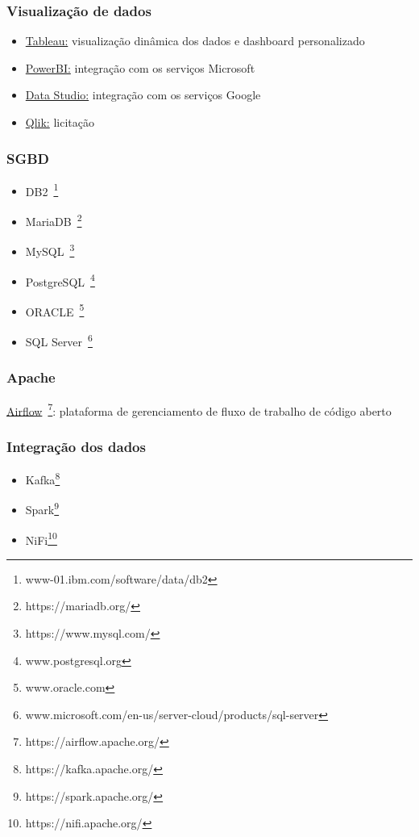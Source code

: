 \subsubsection*{Visualização de dados}
\begin{itemize} 
	\item \underline{Tableau:} visualização dinâmica dos dados e dashboard personalizado
	\item \underline{PowerBI:} integração com os serviços Microsoft
	\item \underline{Data Studio:} integração com os serviços Google
	\item \underline{Qlik:} licitação 
\end{itemize}


\subsubsection*{SGBD}
\begin{itemize}
	\item DB2~\footnote{www-01.ibm.com/software/data/db2}
	\item MariaDB~\footnote{https://mariadb.org/}
	\item MySQL~\footnote{https://www.mysql.com/}
	\item PostgreSQL~\footnote{www.postgresql.org}
	\item ORACLE~\footnote{www.oracle.com}
	\item SQL Server~\footnote{www.microsoft.com/en-us/server-cloud/products/sql-server}
\end{itemize}
	

\subsubsection*{Apache}
\underline{Airflow}~\footnote{https://airflow.apache.org/}: plataforma de gerenciamento de fluxo de trabalho de código aberto


\subsubsection*{Integração dos dados}
\begin{itemize}	
	\item Kafka\footnote{https://kafka.apache.org/}
	\item Spark\footnote{https://spark.apache.org/}
	\item NiFi\footnote{https://nifi.apache.org/}
\end{itemize}


